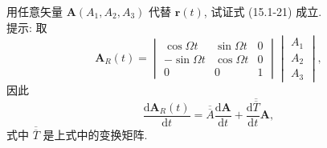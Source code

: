 \documentclass{note}
\begin{document}
\begin{exe}
    用任意矢量 $\bm{A}(A_1,A_2,A_3)$ 代替 $\bm{r}(t)$, 试证式 (15.1-21) 成立.\\
    提示: 取
    \[
        \bm{A}_{R}(t)=\begin{vmatrix}
            \cos\Omega t&\sin\Omega t&0\\
            -\sin\Omega t&\cos\Omega t&0\\
            0&0&1
        \end{vmatrix}\begin{vmatrix}
            A_1\\
            A_2\\
            A_3
        \end{vmatrix},
    \]
    因此
    \[
        \frac{\mathrm{d}\bm{A}_R(t)}{\mathrm{d}t}=\overline{\overline{A}}\frac{\mathrm{d}\bm{A}}{\mathrm{d}t}+\frac{\mathrm{d}\overline{\overline{T}}}{\mathrm{d}t}\bm{A},
    \]
    式中 $\overline{\overline{T}}$ 是上式中的变换矩阵.
\end{exe}
\begin{pf}
    
\end{pf}
\ifx\allfiles\undefined
\end{document}
